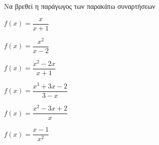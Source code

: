 Να βρεθεί η παράγωγος των παρακάτω συναρτήσεων
\begin{alist}
\item $ f(x)=\dfrac{x}{x+1} $
\item $ f(x)=\dfrac{x^2}{x-2} $
\item $ f(x)=\dfrac{x^2-2x}{x+1} $
\item $ f(x)=\dfrac{x^3+3x-2}{3-x} $
\item $ f(x)=\dfrac{x^2-3x+2}{x} $
\item $ f(x)=\dfrac{x-1}{x^2} $
\end{alist}
